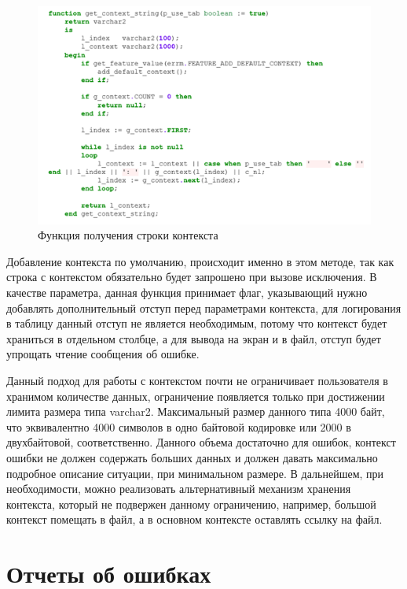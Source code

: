\begin{figure}[ht!] 
	\center
	\includegraphics [scale=1] {my_folder/img/c3_get_context_code.png}
	\caption{Функция получения строки контекста} 
	\label{fig:c3_get_context_code}  
\end{figure}
\FloatBarrier

Добавление контекста по умолчанию, происходит именно в этом методе, так как строка с контекстом обязательно будет запрошено при вызове исключения. В качестве параметра, данная функция принимает флаг, указывающий нужно добавлять дополнительный отступ перед параметрами контекста, для логирования в таблицу данный отступ не является необходимым, потому что контекст будет храниться в отдельном столбце, а для вывода на экран и в файл, отступ будет упрощать чтение сообщения об ошибке.

Данный подход для работы с контекстом почти не ограничивает пользователя в хранимом количестве данных, ограничение появляется только при достижении лимита размера типа varchar2. Максимальный размер данного типа 4000 байт, что эквивалентно 4000 символов в одно байтовой кодировке или 2000 в двухбайтовой, соответственно. Данного объема достаточно для ошибок, контекст ошибки не должен содержать больших данных и должен давать максимально подробное описание ситуации, при минимальном размере. В дальнейшем, при необходимости, можно реализовать альтернативный механизм хранения контекста, который не подвержен данному ограничению, например, большой контекст помещать в файл, а в основном контексте оставлять ссылку на файл. 

\section{Отчеты об ошибках} \label{ch3:sec9}
 
